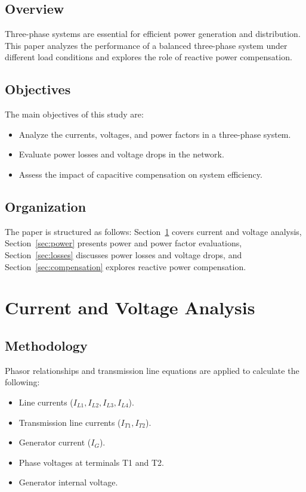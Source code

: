 \documentclass[conference]{IEEEtran}
\begin{document}
\subsection{Overview}
Three-phase systems are essential for efficient power generation and distribution. This paper analyzes the performance of a balanced three-phase system under different load conditions and explores the role of reactive power compensation.

\subsection{Objectives}
The main objectives of this study are:
\begin{itemize}
    \item Analyze the currents, voltages, and power factors in a three-phase system.
    \item Evaluate power losses and voltage drops in the network.
    \item Assess the impact of capacitive compensation on system efficiency.
\end{itemize}

\subsection{Organization}
The paper is structured as follows: Section~\ref{sec:current} covers current and voltage analysis, Section~\ref{sec:power} presents power and power factor evaluations, Section~\ref{sec:losses} discusses power losses and voltage drops, and Section~\ref{sec:compensation} explores reactive power compensation.

\section{Current and Voltage Analysis}
\label{sec:current}
\subsection{Methodology}
Phasor relationships and transmission line equations are applied to calculate the following:
\begin{itemize}
    \item Line currents ($I_{L1}, I_{L2}, I_{L3}, I_{L4}$).
    \item Transmission line currents ($I_{T1}, I_{T2}$).
    \item Generator current ($I_{G}$).
    \item Phase voltages at terminals T1 and T2.
    \item Generator internal voltage.
\end{itemize}
\end{document}
